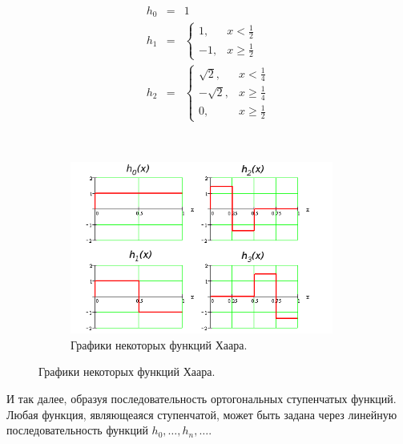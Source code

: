 \documentclass[12pt]{article}
\begin{document}
		\begin{figure}[H]
			\begin{subfigure}[c]{0.5\textwidth}
			\vspace{-40pt}
			\begin{eqnarray*}
				h_0& =& 1 \\		
				h_1& =& 
				\begin{cases}
					1, & x < \frac{1}{2} \\
					-1, & x \geq \frac{1}{2}
				\end{cases} \\		
				h_2& =& 
				\begin{cases}
					\sqrt{2}, & x < \frac{1}{4} \\
					-\sqrt{2}, & x \geq \frac{1}{4} \\
					0, & x \geq \frac{1}{2}
				\end{cases}
			\end{eqnarray*}
			\end{subfigure}
			~
			\begin{subfigure}[c]{0.5\textwidth}
				\includegraphics[width=0.95\textwidth]{../Graphics/Lectures-5-Haar_functions.png}
				\caption{Графики некоторых функций Хаара.}
			\end{subfigure}
		\end{figure}
	
		И так далее, образуя последовательность ортогональных ступенчатых функций. Любая функция, являющеаяся ступенчатой, может
		быть задана через линейную последовательность функций $h_0, \dots, h_n, \dots$.
\end{document}
